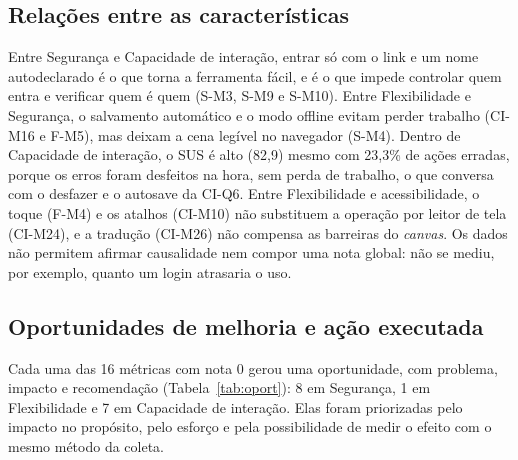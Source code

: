 \documentclass[conference]{IEEEtran}
\begin{document}
\subsection{Relações entre as características}
Entre Segurança e Capacidade de interação, entrar só com o link e um nome
autodeclarado é o que torna a ferramenta fácil, e é o que impede controlar
quem entra e verificar quem é quem (S-M3, S-M9 e S-M10). Entre Flexibilidade
e Segurança, o salvamento automático e o modo offline evitam perder trabalho
(CI-M16 e F-M5), mas deixam a cena legível no navegador (S-M4). Dentro de
Capacidade de interação, o SUS é alto (82,9) mesmo com 23,3\% de ações
erradas, porque os erros foram desfeitos na hora, sem perda de trabalho, o
que conversa com o desfazer e o autosave da CI-Q6. Entre Flexibilidade e
acessibilidade, o toque (F-M4) e os atalhos (CI-M10) não substituem a
operação por leitor de tela (CI-M24), e a tradução (CI-M26) não compensa as
barreiras do \textit{canvas}. Os dados não permitem afirmar causalidade nem
compor uma nota global: não se mediu, por exemplo, quanto um login atrasaria
o uso.

\subsection{Oportunidades de melhoria e ação executada}
\label{sec:melhoria}

Cada uma das 16 métricas com nota 0 gerou uma oportunidade, com problema,
impacto e recomendação (Tabela~\ref{tab:oport}): 8 em Segurança, 1 em
Flexibilidade e 7 em Capacidade de interação. Elas foram priorizadas pelo
impacto no propósito, pelo esforço e pela possibilidade de medir o efeito
com o mesmo método da coleta.
\end{document}
